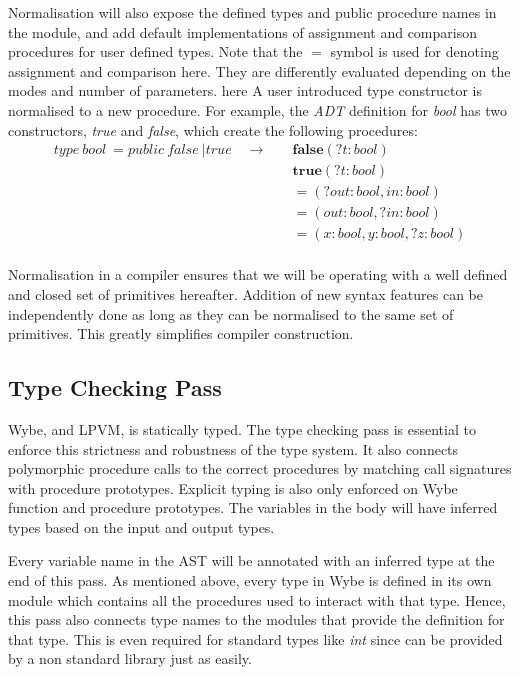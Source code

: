 Normalisation will also expose the defined types and public procedure names in
the module, and add default implementations of assignment and comparison
procedures for user defined types. Note that the $=$ symbol is used for denoting
assignment and comparison here. They are differently evaluated depending on the
modes and number of parameters. here A user introduced type constructor is
normalised to a new procedure. For example, the \textit{ADT} definition for
\textit{bool} has two constructors, \textit{true} and \textit{false}, which
create the following procedures:
\begin{align*}
  type\ bool\ = public\ false\ \vert true
  \quad \rightarrow & \quad
                      \mathbf{false}(?t:bool) \\
                    & \quad
                      \mathbf{true}(?t:bool) \\
                    & \quad
                      \mathbf{=}(?out:bool, in:bool) \\
                    & \quad
                      \mathbf{=}(out:bool, ?in:bool) \\
                    & \quad
                      \mathbf{=}(x:bool, y:bool, ?z:bool) \\
\end{align*}

Normalisation in a compiler ensures that we will be operating with a well
defined and closed set of primitives hereafter. Addition of new syntax features
can be independently done as long as they can be normalised to the same set of
primitives. This greatly simplifies compiler construction.

\subsection{Type Checking Pass}

Wybe, and LPVM, is statically typed. The type checking pass is essential to
enforce this strictness and robustness of the type system. It also connects
polymorphic procedure calls to the correct procedures by matching call
signatures with procedure prototypes. Explicit typing is also only enforced on
Wybe function and procedure prototypes. The variables in the body will have
inferred types based on the input and output types.

Every variable name in the AST will be annotated with an inferred type at the
end of this pass. As mentioned above, every type in Wybe is defined in its own
module which contains all the procedures used to interact with that
type. Hence, this pass also connects type names to the modules that provide the
definition for that type. This is even required for standard types like
\textit{int} since can be provided by a non standard library just as
easily.


